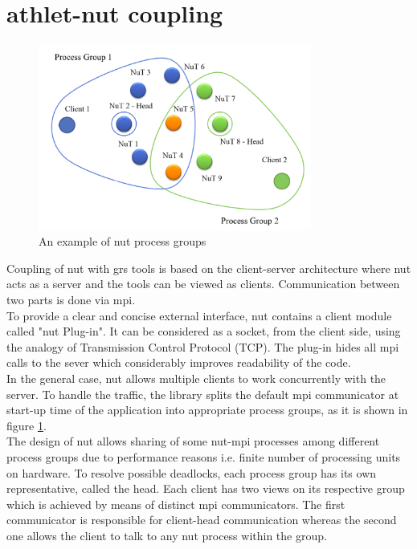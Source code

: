 \section{\gls{athlet}-\gls{nut} coupling}
\label{sec:athlet-nut-coupling}

\figpointer{\ref{fig:introduction-nut-process-groups}}
\begin{figure}[htpb]
  \centering
  \includegraphics[width=0.8\textwidth]{figures/introduction-nut-process-groups.png}
\caption{An example of \gls{nut} process groups}
\label{fig:introduction-nut-process-groups}
\end{figure}

Coupling of \gls{nut} with \gls{grs} tools is based on the client-server architecture where \gls{nut} acts as a server and the tools can be viewed as clients. Communication between two parts is done via \gls{mpi}.\\


To provide a clear and concise external interface, \gls{nut} contains a client module called "\gls{nut} Plug-in". It can be  considered as a socket, from the client side, using the analogy of Transmission Control Protocol (TCP). The plug-in hides all \gls{mpi} calls to the sever which considerably improves readability of the code.\\


In the general case, \gls{nut} allows multiple clients to work concurrently with the server. To handle the traffic, the library splits the default \gls{mpi} communicator at start-up time of the application into appropriate process groups, as it is shown in figure \ref{fig:introduction-nut-process-groups}.\\



The design of \gls{nut} allows sharing of some \gls{nut}-\gls{mpi} processes among different process groups due to performance reasons i.e. finite number of processing units on hardware. To resolve possible deadlocks, each process group has its own representative, called the head. Each client has two views on its respective group which is achieved by means of distinct \gls{mpi} communicators. The first communicator is responsible for client-head communication whereas the second one allows the client to talk to any \gls{nut} process within the group.\\



